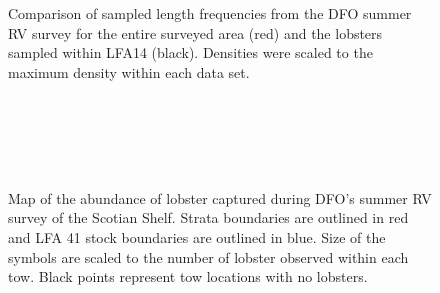 \documentclass[11pt]{article}
\newcommand{\D}{.}
\newcommand{\e}{/backup/bio_data/bio.lobster/figures/} %
\begin{document}
\begin{figure}
\centering
    \caption{Comparison of sampled length frequencies from the DFO summer RV survey for the entire surveyed area (red) and the lobsters sampled within LFA14 (black). Densities were scaled to the maximum density within each data set.}
\end{figure}

        \begin{figure}
        \centering
        \\
        \\
        \\
        \\


         \caption{Map of the abundance of lobster captured during DFO's summer RV survey of the Scotian Shelf. Strata boundaries are outlined in red and LFA 41 stock boundaries are outlined in blue. Size of the symbols are scaled to the number of lobster observed within each tow. Black points represent tow locations with no lobsters.}
        \end{figure}
        \clearpage
\end{document}
